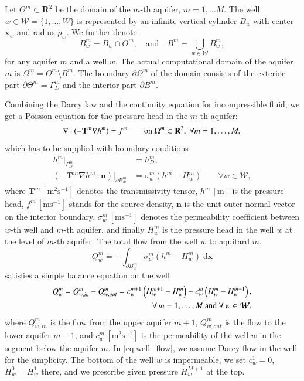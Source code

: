 \documentclass{elsarticle}
\def\vc#1{\mathbf{\boldsymbol{#1}}}     %
\def\prtl{\partial}
\newcommand{\dd}{\; \mathrm{d}}
\newcommand{\R}{\mathbf{R}}
\newcommand{\bx}{\vc{x}}
\begin{document}
Let $\Theta^m\subset \R^2$ be the domain of the $m$-th aquifer, $m=1,\ldots M$.
The well $w\in\mathcal{W}=\{1,\ldots,W\}$ is represented by an infinite vertical cylinder $B_w$
with center $\vc{x}_w$ and radius $\rho_w$.  We further denote 
\[
 B^m_w = B_w \cap \Theta^m, \quad \text{and} \quad
 B^m=\bigcup_{w\in \mathcal{W}}B^m_w,
\]
for any aquifer $m$ and a well $w$.
The actual computational domain of the aquifer $m$ is $\Omega^m = \Theta^m\setminus B^m$. The boundary $\partial\Omega^m$ of 
the domain consists of the exterior part $\partial\Theta^m=\Gamma^m_D$ and the interior part $\partial B^m$.


Combining the Darcy law and the continuity equation for incompressible fluid, we get
a Poisson equation for the pressure head in the $m$-th aquifer:
\begin{equation} \label{eqn:poisson}
\nabla\cdot(-\mathbf{T}^m\nabla h^m) = f^m \qquad \textrm{on } \Omega^m\subset\R^2,\; \forall m=1,\dots,M, \\
\end{equation}
which has to be supplied with boundary conditions
\begin{align}
h^m|_{\Gamma^m_D} &= h^m_D, \\
\label{eq:interior_bc}
\left(-\mathbf{T}^m\nabla h^m\cdot\vc{n}\right)|_{\partial B^m_w} &= \sigma^m_w(h^m - H^m_w) \qquad \forall w\in\mathcal{W},
\end{align}
where $\mathbf{T}^m\, [\textrm{m}^2\textrm{s}^{-1}]$ denotes the transmissivity tensor,
$h^m\, [\textrm{m}]$ is the pressure head, $f^m\, [\textrm{m}\textrm{s}^{-1}]$ stands for the source density,
$\vc{n}$ is the unit outer normal vector on the interior boundary,
$\sigma^m_w\, [\textrm{m}\textrm{s}^{-1}]$ denotes the permeability coefficient between $w$-th well and 
$m$-th aquifer, and finally $H_w^m$ is the pressure head in the well $w$ at the level of $m$-th aquifer.
%
%
The total flow from the well $w$ to aquitard $m$,
\[
    Q^m_w =-\int_{\prtl B^m_w} \sigma^m_w(h^m - H^m_w)  \dd\bx
\]
satisfies a simple balance equation on the well
\begin{align}
    \label{eq:well_flow}
    Q_w^m = Q^m_{w,in} - Q^m_{w,out} = c^{m+1}_w\left( H^{m+1}_w-H^m_w \right) - c_w^m\left( H^m_w-H_w^{m-1}\right),&\\
    \notag
    \forall\,m=1,\dots,M\text{ and }\forall\,w\in\mathcal{W},&
\end{align}
where $Q^m_{w,in}$ is the flow from the upper aquifer $m+1$, $Q^m_{w,out}$ is the flow to the lower aquifer $m-1$, and 
$c^m_w\, [\textrm{m}^2\textrm{s}^{-1}]$ is the permeability of the well $w$ in the segment below the aquifer $m$.
%
In \eqref{eq:well_flow}, we assume Darcy flow in the well for the simplicity. The bottom of the well $w$ is impermeable,
we set $c^1_w=0$, $H^0_w=H^1_w$ there, and we prescribe given pressure $H^{M+1}_w$ at the top.
\end{document}
